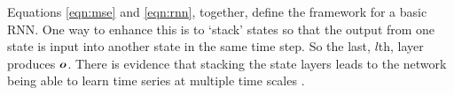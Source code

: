 Equations \ref{eqn:mse} and \ref{eqn:rnn}, together, define the framework for a basic RNN. One way to enhance this is to `stack' states so that the output from one state is input into another state in the same time step. So the last, $l$th, layer produces $\boldsymbol{o}$.  There is evidence that stacking the state layers leads to the network being able to learn time series at multiple time scales \cite{Hermans2013,Pascanu2013a}.

\newsavebox{\rnn}
\newsavebox{\rnnuf}
